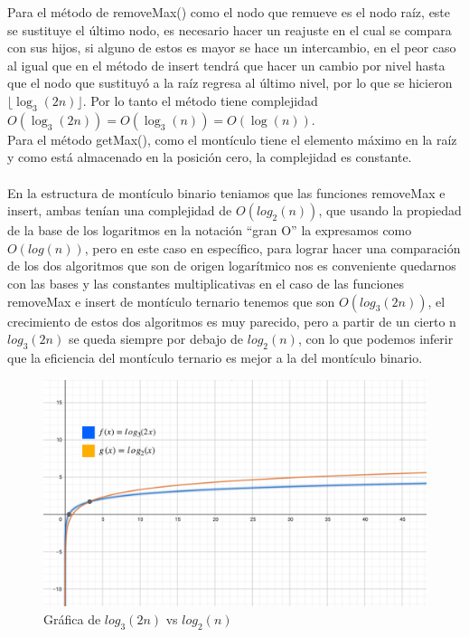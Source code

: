 \documentclass[11pt]{article}
\begin{document}
\begin{enumerate}
\begin{itemize}
Para el método de removeMax() como el nodo que remueve es el nodo raíz, este se sustituye el último nodo, es necesario hacer un reajuste en el cual se  compara con sus hijos, si alguno de estos es mayor se hace un intercambio, en el peor caso al igual que en el método de insert tendrá que hacer un cambio por nivel hasta que el nodo que sustituyó a la raíz regresa al último nivel, por lo que se hicieron $\lfloor\log_3(2n)\rfloor$. Por lo tanto el método tiene complejidad $O(\log_3(2n))=O(\log_3(n))=O(\log(n))$. 
\\
Para el método getMax(), como el montículo tiene el elemento máximo en la raíz y como está almacenado en la posición cero, la complejidad es constante.
 \\
 \\En la estructura de montículo binario teniamos que las funciones removeMax e insert, ambas tenían una complejidad de $O(log_2 (n))$, que usando la propiedad de la base de los logaritmos en la notación “gran O”  la expresamos como $O(log(n))$, pero en este caso en específico, para lograr hacer una comparación de los dos algoritmos que son de origen logarítmico nos es conveniente quedarnos con las bases y las constantes multiplicativas en el caso de las funciones removeMax e insert de montículo ternario tenemos que son $O(log_3(2n))$, el crecimiento de estos dos algoritmos es muy parecido, pero a partir de un cierto n $log_3(2n)$ se queda siempre por debajo de $log_2(n)$, con lo que podemos inferir que la eficiencia del montículo ternario es mejor a la del montículo binario. 
 
   \begin{figure}[!h]
        \centering
        \includegraphics[scale=0.3]{grafica_log.jpg}
        \caption{Gráfica de $log_3(2n)$ vs $log_2(n)$}
    \end{figure}
    


\end{itemize}
\end{enumerate}
\end{document}
